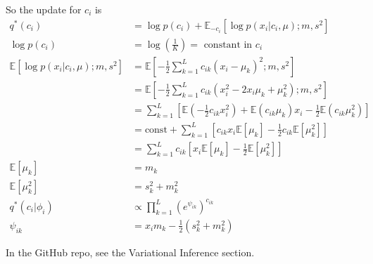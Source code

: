 \documentclass{article}
\newcommand{\E}{ \ensuremath{ \mathbb{E} }}
\newcommand{\mycite}[1]{\item[\cite{#1}] ~\\ \fullcite{#1} \\ ~ \\}
\begin{document}
So the update for $c_i$ is
\begin{align*}
  q^*(c_i) &= \log p(c_i) + \E_{-c_i} \left[ \log p(x_i | c_i, \mu) ; m, s^2 \right]
  \\
  \log p(c_i) &= \log \left( \frac{1}{K} \right) = \textrm{ constant in } c_i
  \\
  \E \left[ \log p(x_i | c_i, \mu) ; m, s^2 \right] &= \E \left[ -\frac12 \sum_{k=1}^L c_{ik}(x_i-\mu_k)^2 ; m, s^2 \right]
  \\
  &= \E \left[ -\frac12 \sum_{k=1}^L c_{ik}(x_i^2-2x_i\mu_k+\mu_k^2) ; m, s^2 \right]
  \\
  &= \sum_{k=1}^L \left[  \E \left( -\frac12  c_{ik} x_i^2 \right) + \E \left( c_{ik}\mu_k \right)x_i - \frac12 \E(c_{ik}\mu_k^2) \right]
  \\
  &= \textrm{const} + \sum_{k=1}^L \left[ c_{ik} x_i \E[\mu_k] - \frac12 c_{ik} \E[\mu_k^2] \right]
  \\
  &= \sum_{k=1}^L c_{ik} \left[ x_i \E[\mu_k] - \frac12 \E[\mu_k^2] \right]
  \\
  \E[\mu_k] &= m_k
  \\
  \E[\mu_k^2] &= s_k^2 + m_k^2
  \\
  q^*(c_i| \phi_i) &\propto \prod_{k=1}^L (e^{\psi_{ik}})^{c_{ik}}
  \\
  \psi_{ik} &= x_i m_k - \frac12 (s_k^2 + m_k^2)
\end{align*}

In the GitHub repo, see the Variational Inference section.



\end{document}
